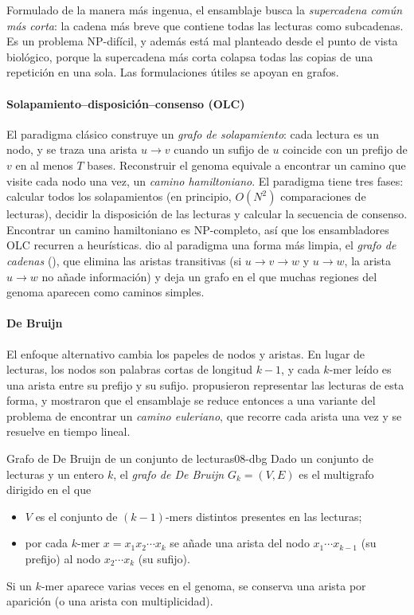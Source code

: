 Formulado de la manera más ingenua, el ensamblaje busca la \emph{supercadena común más corta}: la cadena más breve que contiene todas las lecturas como subcadenas. Es un problema NP-difícil, y además está mal planteado desde el punto de vista biológico, porque la supercadena más corta colapsa todas las copias de una repetición en una sola. Las formulaciones útiles se apoyan en grafos.

\paragraph{Solapamiento--disposición--consenso (OLC)} El paradigma clásico construye un \emph{grafo de solapamiento}: cada lectura es un nodo, y se traza una arista $u\to v$ cuando un sufijo de $u$ coincide con un prefijo de $v$ en al menos $T$ bases. Reconstruir el genoma equivale a encontrar un camino que visite cada nodo una vez, un \emph{camino hamiltoniano}. El paradigma tiene tres fases: calcular todos los solapamientos (en principio, $O(N^2)$ comparaciones de lecturas), decidir la disposición de las lecturas y calcular la secuencia de consenso. Encontrar un camino hamiltoniano es NP-completo, así que los ensambladores OLC recurren a heurísticas. \textcite{c08-myers2005} dio al paradigma una forma más limpia, el \emph{grafo de cadenas} (), que elimina las aristas transitivas (si $u\to v\to w$ y $u\to w$, la arista $u\to w$ no añade información) y deja un grafo en el que muchas regiones del genoma aparecen como caminos simples.

\paragraph{De Bruijn} El enfoque alternativo cambia los papeles de nodos y aristas. En lugar de lecturas, los nodos son palabras cortas de longitud $k-1$, y cada $k$-mer leído es una arista entre su prefijo y su sufijo. \textcite{c08-idury1995} propusieron representar las lecturas de esta forma, y \textcite{c08-pevzner2001} mostraron que el ensamblaje se reduce entonces a una variante del problema de encontrar un \emph{camino euleriano}, que recorre cada arista una vez y se resuelve en tiempo lineal.

\begin{definicion}{Grafo de De Bruijn de un conjunto de lecturas}{08-dbg}
Dado un conjunto de lecturas y un entero $k$, el \emph{grafo de De Bruijn} $G_k=(V,E)$ es el multigrafo dirigido en el que
\begin{itemize}
  \item $V$ es el conjunto de $(k-1)$-mers distintos presentes en las lecturas;
  \item por cada $k$-mer $x=x_1x_2\cdots x_k$ se añade una arista del nodo $x_1\cdots x_{k-1}$ (su prefijo) al nodo $x_2\cdots x_k$ (su sufijo).
\end{itemize}
Si un $k$-mer aparece varias veces en el genoma, se conserva una arista por aparición (o una arista con multiplicidad).
\end{definicion}

